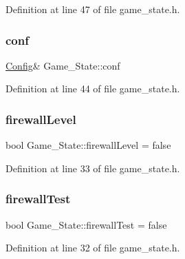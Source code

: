Definition at line 47 of file game\+\_\+state.\+h.

\hypertarget{class_game___state_a6f82c6c66962953aee7de556d3877eeb}{}\label{class_game___state_a6f82c6c66962953aee7de556d3877eeb} 
\subsubsection{\texorpdfstring{conf}{conf}}
{\footnotesize\ttfamily \hyperlink{class_config}{Config}\& Game\+\_\+\+State\+::conf\hspace{0.3cm}{\ttfamily [protected]}}



Definition at line 44 of file game\+\_\+state.\+h.

\hypertarget{class_game___state_a0e432196bf012dbfa928c947d829ae69}{}\label{class_game___state_a0e432196bf012dbfa928c947d829ae69} 
\subsubsection{\texorpdfstring{firewall\+Level}{firewallLevel}}
{\footnotesize\ttfamily bool Game\+\_\+\+State\+::firewall\+Level = false\hspace{0.3cm}{\ttfamily [protected]}}



Definition at line 33 of file game\+\_\+state.\+h.

\hypertarget{class_game___state_a6da4c593a72687a91c91027463fb9083}{}\label{class_game___state_a6da4c593a72687a91c91027463fb9083} 
\subsubsection{\texorpdfstring{firewall\+Test}{firewallTest}}
{\footnotesize\ttfamily bool Game\+\_\+\+State\+::firewall\+Test = false\hspace{0.3cm}{\ttfamily [protected]}}



Definition at line 32 of file game\+\_\+state.\+h.

\hypertarget{class_game___state_a800d81a46d0b4dead0b3516ab24ebc9c}{}\label{class_game___state_a800d81a46d0b4dead0b3516ab24ebc9c} 
